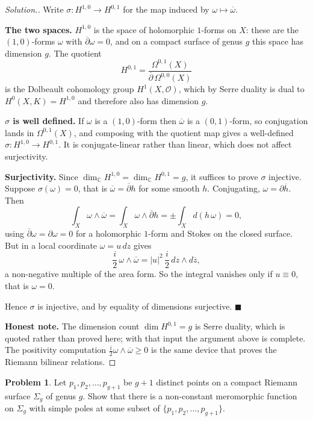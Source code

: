 \documentclass[11pt,a4paper]{article}
\theoremstyle{definition}
\newtheorem{problemx}{Problem}[section]
\newenvironment{problem}{\begin{problemx}}{\end{problemx}}
\newenvironment{solution}
  {\renewcommand{\qedsymbol}{}\begin{proof}[\textit{Solution}.]}
  {\end{proof}}
\begin{document}
\begin{solution}
Write $\sigma : H^{1,0} \rightarrow H^{0,1}$ for the map induced by
$\omega \mapsto \overline{\omega}$.

\textbf{The two spaces.} $H^{1,0}$ is the space of holomorphic $1$-forms on $X$:
these are the $(1,0)$-forms $\omega$ with $\overline{\partial}\omega = 0$, and on a
compact surface of genus $g$ this space has dimension $g$. The quotient
$$H^{0,1} = \frac{\Omega^{0,1}(X)}{\overline{\partial}\,\Omega^{0,0}(X)}$$
is the Dolbeault cohomology group $H^{1}(X,\mathcal{O})$, which by Serre duality is
dual to $H^{0}(X,K) = H^{1,0}$ and therefore also has dimension $g$.

\textbf{$\sigma$ is well defined.} If $\omega$ is a $(1,0)$-form then
$\overline{\omega}$ is a $(0,1)$-form, so conjugation lands in $\Omega^{0,1}(X)$,
and composing with the quotient map gives a well-defined
$\sigma : H^{1,0} \rightarrow H^{0,1}$. It is conjugate-linear rather than linear,
which does not affect surjectivity.

\textbf{Surjectivity.} Since $\dim_{\mathbb{C}} H^{1,0} = \dim_{\mathbb{C}} H^{0,1} = g$,
it suffices to prove $\sigma$ injective. Suppose $\sigma(\omega) = 0$, that is
$\overline{\omega} = \overline{\partial} h$ for some smooth $h$. Conjugating,
$\omega = \partial\overline{h}$. Then
$$\int_{X}\omega\wedge\overline{\omega}
= \int_{X}\omega\wedge\overline{\partial}h
= \pm\int_{X} d\left(h\,\omega\right) = 0,$$
using $\overline{\partial}\omega = \partial\omega = 0$ for a holomorphic $1$-form
and Stokes on the closed surface. But in a local coordinate
$\omega = u\,dz$ gives
$$\frac{i}{2}\,\omega\wedge\overline{\omega} = \left|u\right|^{2}\,\frac{i}{2}\,dz\wedge d\overline{z},$$
a non-negative multiple of the area form. So the integral vanishes only if
$u \equiv 0$, that is $\omega = 0$.

Hence $\sigma$ is injective, and by equality of dimensions surjective.
$\blacksquare$

\textbf{Honest note.} The dimension count $\dim H^{0,1} = g$ is Serre duality, which
is quoted rather than proved here; with that input the argument above is complete.
The positivity computation $\frac{i}{2}\omega\wedge\overline{\omega} \geq 0$ is the
same device that proves the Riemann bilinear relations.
\end{solution}


\begin{problem}
Let $p_1, p_2, \ldots, p_{g+1}$ be $g+1$ distinct points on a compact Riemann
surface $\Sigma_g$ of genus $g$. Show that there is a non-constant meromorphic
function on $\Sigma_g$ with simple poles at some subset of
$\{p_1, p_2, \ldots, p_{g+1}\}$.
\end{problem}
\end{document}
